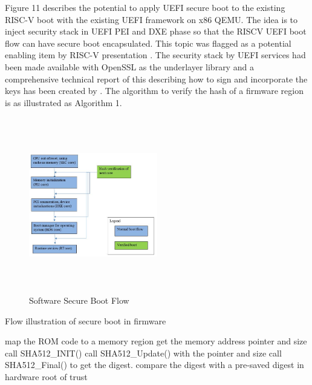 \documentclass[a4paper,fleqn]{cas-dc}
\begin{document}
Figure 11 describes the potential to apply UEFI secure boot to the existing RISC-V boot with the existing UEFI framework on x86 QEMU. The idea is to inject security stack in UEFI PEI and DXE phase so that the RISCV UEFI boot flow can have secure boot encapsulated. This topic was flagged as a potential enabling item by RISC-V presentation \cite{R5:10}. The security stack by UEFI services had been made available with OpenSSL as the underlayer library and a comprehensive technical report of this describing how to sign and incorporate the keys has been created by \cite{R5:11}. The algorithm to verify the hash of a firmware region is as illustrated as Algorithm 1.

\begin{figure}[hbt!]
	\centering
	\includegraphics[width=0.5\textwidth,height=3in]{figs/SoftwareSecureBootFlow.JPG}
	\caption{Software Secure Boot Flow}
\end{figure}



\begin{algorithm}
 \caption{Flow illustration of secure boot in firmware}
map the ROM code to a memory region\;
get the memory address pointer and size\;
call SHA512\_INIT()\;
call SHA512\_Update() with the pointer and size\;
call SHA512\_Final() to get the digest.\;
compare the digest with a pre-saved digest in hardware root of trust\;


\end{algorithm}
\end{document}
